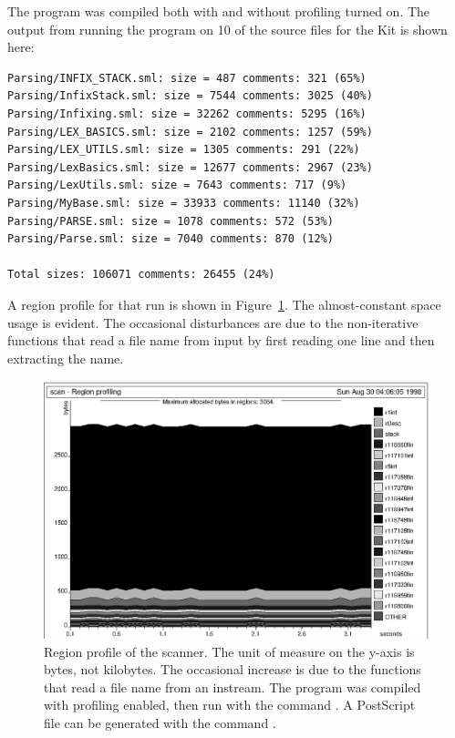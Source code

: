\documentclass[12pt]{book}
\begin{document}
The program was compiled both with and without profiling turned on.
The output from running the program on 10 of the source files for the
Kit is shown here:
\begin{verbatim}
Parsing/INFIX_STACK.sml: size = 487 comments: 321 (65%)
Parsing/InfixStack.sml: size = 7544 comments: 3025 (40%)
Parsing/Infixing.sml: size = 32262 comments: 5295 (16%)
Parsing/LEX_BASICS.sml: size = 2102 comments: 1257 (59%)
Parsing/LEX_UTILS.sml: size = 1305 comments: 291 (22%)
Parsing/LexBasics.sml: size = 12677 comments: 2967 (23%)
Parsing/LexUtils.sml: size = 7643 comments: 717 (9%)
Parsing/MyBase.sml: size = 33933 comments: 11140 (32%)
Parsing/PARSE.sml: size = 1078 comments: 572 (53%)
Parsing/Parse.sml: size = 7040 comments: 870 (12%)

Total sizes: 106071 comments: 26455 (24%)
\end{verbatim}
A region profile for that run is shown in Figure~\ref{scan.fig}.  The
almost-constant space usage is evident. The occasional disturbances
are due to the non-iterative functions that read a file name from
input by first reading one line and then extracting the name.
\begin{figure}
\begin{center}
\includegraphics{scan.ps}
\end{center}
\caption{Region profile of the scanner. The unit of measure on 
  the y-axis is bytes, not kilobytes. The occasional increase is due
  to the functions that read a file name from an instream.  The
  program was compiled with profiling enabled, then run with the
  command . A
  PostScript file  can be generated with the command
  .  }
\label{scan.fig}
\end{figure}
%
%
\end{document}

